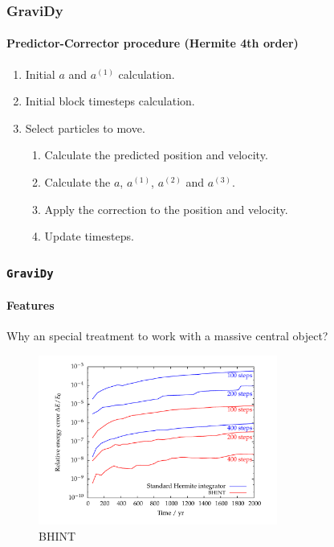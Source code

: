 \begin{frame}
    \frametitle{GraviDy}
    \framesubtitle{Predictor-Corrector procedure (Hermite 4th order)}
    \begin{enumerate}
        \item Initial $a$ and $a^{(1)}$ calculation.
        \item Initial block timesteps calculation.
        \item Select particles to move.
        \begin{enumerate}
            \item Calculate the predicted position and velocity.
            \item Calculate the $a$, $a^{(1)}$, $a^{(2)}$ and $a^{(3)}$.
            \item Apply the correction to the position and velocity.
            \item Update timesteps.
        \end{enumerate}
    \end{enumerate}
\end{frame}



\begin{frame}
    \frametitle{\texttt{GraviDy}}
    \framesubtitle{Features}
    Why an special treatment to work with a massive central object?
    \begin{figure}
        \centering
        \label{fig:energy}
        \includegraphics[width=0.7\textwidth]{img/bhint_errors}
        \caption{BHINT ~\cite{2006IAUJD...6E..24L}}
    \end{figure}
\end{frame}


